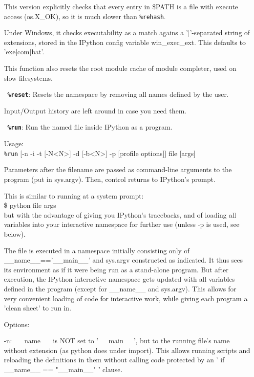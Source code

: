         This version explicitly checks that every entry in \$PATH is a file
        with execute access (os.X\_OK), so it is much slower than \texttt{\%rehash}.

        Under Windows, it checks executability as a match agains a
        '|'-separated string of extensions, stored in the IPython config
        variable win\_exec\_ext.  This defaults to 'exe|com|bat'.
        
        This function also resets the root module cache of module completer,
        used on slow filesystems.
        

\bigskip
\texttt{\textbf{ \%reset}}:
	Resets the namespace by removing all names defined by the user.

        Input/Output history are left around in case you need them.

\bigskip
\texttt{\textbf{ \%run}}:
	Run the named file inside IPython as a program.

        Usage:\\
          \texttt{\%run} [-n -i -t [-N<N>] -d [-b<N>] -p [profile options]] file [args]
        
        Parameters after the filename are passed as command-line arguments to
        the program (put in sys.argv). Then, control returns to IPython's
        prompt.

        This is similar to running at a system prompt:\\
          \$ python file args\\
        but with the advantage of giving you IPython's tracebacks, and of
        loading all variables into your interactive namespace for further use
        (unless -p is used, see below).

        The file is executed in a namespace initially consisting only of
        \_\_name\_\_=='\_\_main\_\_' and sys.argv constructed as indicated. It thus
        sees its environment as if it were being run as a stand-alone
        program. But after execution, the IPython interactive namespace gets
        updated with all variables defined in the program (except for \_\_name\_\_
        and sys.argv). This allows for very convenient loading of code for
        interactive work, while giving each program a 'clean sheet' to run in.

        Options:
        
        -n: \_\_name\_\_ is NOT set to '\_\_main\_\_', but to the running file's name
        without extension (as python does under import).  This allows running
        scripts and reloading the definitions in them without calling code
        protected by an ' if \_\_name\_\_ == "\_\_main\_\_" ' clause.

